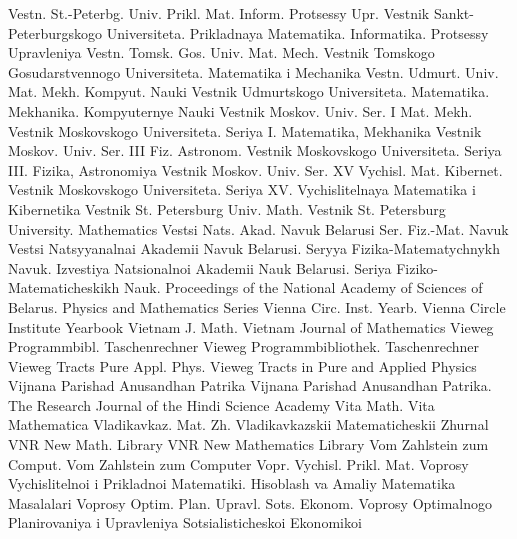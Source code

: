 {Vestn. St.-Peterbg. Univ. Prikl. Mat. Inform. Protsessy Upr.}
{Vestnik Sankt-Peterburgskogo Universiteta. Prikladnaya Matematika. Informatika. Protsessy Upravleniya}
{Vestn. Tomsk. Gos. Univ. Mat. Mech.}
{Vestnik Tomskogo Gosudarstvennogo Universiteta. Matematika i Mechanika}
{Vestn. Udmurt. Univ. Mat. Mekh. Kompyut. Nauki}
{Vestnik Udmurtskogo Universiteta. Matematika. Mekhanika. Kompyuternye Nauki}
{Vestnik Moskov. Univ. Ser. I Mat. Mekh.}
{Vestnik Moskovskogo Universiteta. Seriya I. Matematika, Mekhanika}
{Vestnik Moskov. Univ. Ser. III Fiz. Astronom.}
{Vestnik Moskovskogo Universiteta. Seriya III. Fizika, Astronomiya}
{Vestnik Moskov. Univ. Ser. XV Vychisl. Mat. Kibernet.}
{Vestnik Moskovskogo Universiteta. Seriya XV. Vychislitelnaya Matematika i Kibernetika}
{Vestnik St. Petersburg Univ. Math.}
{Vestnik St. Petersburg University. Mathematics}
{Vestsi Nats. Akad. Navuk Belarusi Ser. Fiz.-Mat. Navuk}
{Vestsi Natsyyanalnai Akademii Navuk Belarusi. Seryya Fizika-Matematychnykh Navuk. Izvestiya Natsionalnoi Akademii Nauk Belarusi. Seriya Fiziko-Matematicheskikh Nauk. Proceedings of the National Academy of Sciences of Belarus. Physics and Mathematics Series}
{Vienna Circ. Inst. Yearb.}
{Vienna Circle Institute Yearbook}
{Vietnam J. Math.}
{Vietnam Journal of Mathematics}
{Vieweg Programmbibl. Taschenrechner}
{Vieweg Programmbibliothek. Taschenrechner}
{Vieweg Tracts Pure Appl. Phys.}
{Vieweg Tracts in Pure and Applied Physics}
{Vijnana Parishad Anusandhan Patrika}
{Vijnana Parishad Anusandhan Patrika. The Research Journal of the Hindi Science Academy}
{Vita Math.}
{Vita Mathematica}
{Vladikavkaz. Mat. Zh.}
{Vladikavkazskii Matematicheskii Zhurnal}
{VNR New Math. Library}
{VNR New Mathematics Library}
{Vom Zahlstein zum Comput.}
{Vom Zahlstein zum Computer}
{Vopr. Vychisl. Prikl. Mat.}
{Voprosy Vychislitelnoi i Prikladnoi Matematiki. Hisoblash va Amaliy Matematika Masalalari}
{Voprosy Optim. Plan. Upravl. Sots. Ekonom.}
{Voprosy Optimalnogo Planirovaniya i Upravleniya Sotsialisticheskoi Ekonomikoi}
